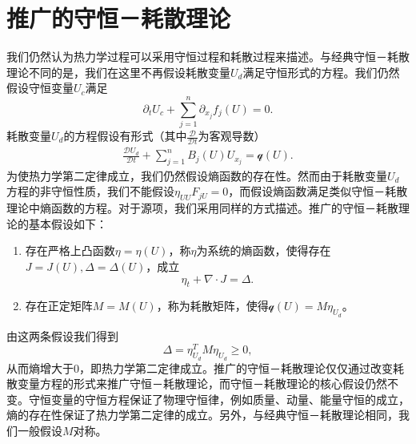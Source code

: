
\section{推广的守恒－耗散理论}
我们仍然认为热力学过程可以采用守恒过程和耗散过程来描述。与经典守恒－耗散理论不同的是，我们在这里不再假设耗散变量$U_d$满足守恒形式的方程。我们仍然假设守恒变量$U_c$满足
\begin{equation*}
	\partial_t U_c + \sum_{j=1}^n \partial_{x_j} f_j(U) = 0.
\end{equation*}
耗散变量$U_d$的方程假设有形式（其中$\frac{\mathcal{D} }{\mathcal{D} t}$为客观导数）
\begin{eqnarray*}
	\frac{\mathcal{D} U_d}{\mathcal{D} t} + \sum_{j=1}^n B_{j}(U)U_{x_j} = \mathcal{q}(U).
\end{eqnarray*}
为使热力学第二定律成立，我们仍然假设熵函数的存在性。然而由于耗散变量$U_d$方程的非守恒性质，我们不能假设$\eta_{UU}F_{jU} = 0$，而假设熵函数满足类似守恒－耗散理论中熵函数的方程。对于源项，我们采用同样的方式描述。推广的守恒－耗散理论的基本假设如下：
\begin{enumerate}
		\item 存在严格上凸函数$\eta = \eta (U)$，称$\eta$为系统的熵函数，使得存在$J=J(U),\Delta = \Delta(U)$，成立
		\begin{equation}
			\eta_t + \nabla \cdot J = \Delta.
		\end{equation}
		\item 存在正定矩阵$M = M(U)$，称为耗散矩阵，使得$\mathcal{q}(U) = M \eta_{U_d}$。
	\end{enumerate}
	由这两条假设我们得到
	\begin{equation*}
		\Delta = \eta_{U_d}^T M \eta_{U_d} \ge 0,
	\end{equation*}
从而熵增大于0，即热力学第二定律成立。推广的守恒－耗散理论仅仅通过改变耗散变量方程的形式来推广守恒－耗散理论，而守恒－耗散理论的核心假设仍然不变。守恒变量的守恒方程保证了物理守恒律，例如质量、动量、能量守恒的成立，熵的存在性保证了热力学第二定律的成立。另外，与经典守恒－耗散理论相同，我们一般假设$M$对称。


